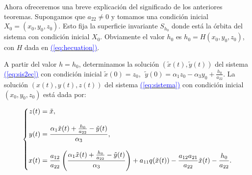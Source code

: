 \documentclass[12pt,a4paper]{report} %
\newcommand{\eref}[1]{\hyperref[#1]{\textcolor{blue}{(\ref*{#1})}}}
\newcommand{\eref}[1]{\hyperref[#1]{\textcolor{blue}{\textit{(\ref*{#1})}}}}
\begin{document}
	\vspace{0.5cm}Ahora ofreceremos una breve explicación del significado de los anteriores teoremas. Supongamos que $a_{22}\neq 0$ y tomamos una condición inicial $X_0=(x_0,y_0,z_0)$. Esto fija la superficie invariante $S_{h_0}$ donde está la órbita del sistema con condición inicial $X_0$. Obviamente el valor $h_0$ es $h_0=H(x_0,y_0,z_0)$, con $H$ dada en \eref{eq:hecuation}.
	
	\vspace{0.5cm}A partir del valor $h=h_0$, determinamos la solución $\left( \tilde{x}(t),\tilde{y}(t) \right)$ del sistema \eref{eq:sis2ec} con condición inicial $\tilde{x}(0)=z_0$, $\; \tilde{y}(0)=\alpha_1z_0-\alpha_3y_0+\frac{h_0}{a_{22}}$. La solución $(x(t),y(t),z(t))$ del sistema \eref{eq:sistema} con condición inicial $(x_0,y_0,z_0)$ está dada por:
	
	\begin{equation}
		\label{eq:solsis}
		\scalebox{1}{$\displaystyle
			\left\{
			\begin{aligned}
				z(t)&=\tilde{x}, \\[3mm]
				y(t)&= \frac{\alpha_1\tilde{x}(t)+\frac{h_0}{a_{22}}-\tilde{y}(t)}{\alpha_3},\\[3mm]
				x(t)&=\frac{a_{12}}{a_{22}}\left( \frac{\alpha_1\tilde{x}(t)+\frac{h_0}{a_{22}}-\tilde{y}(t)}{\alpha_3} \right) +a_{11}q(\tilde{x}(t))-\frac{a_{12}a_{21}}{a_{22}}\tilde{x}(t)-\frac{h_0}{a_{22}}.
			\end{aligned}
			\right.
			$}
	\end{equation}\smallskip
	

	
\end{document}
